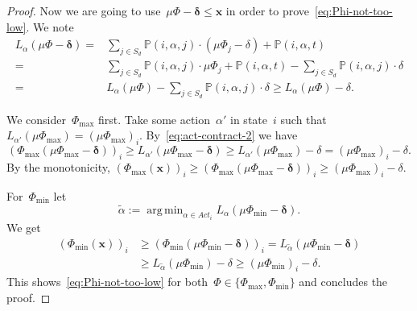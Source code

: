 \documentclass[preprint,12pt]{elsarticle}
\theoremstyle{plain}
\theoremstyle{definition}
\theoremstyle{remark}
\theoremstyle{claimstyle}
\newcommand{\prob}{\mathbb{P}}
\DeclareMathOperator*{\argmin}{arg\,min}
\begin{document}
\begin{proof}
Now we are going to use~$\mu\Phi - \bm{\delta} \leq \bm{x}$ in order to prove~\cref{eq:Phi-not-too-low}. We note
\begin{align}\label{eq:act-contract-2}
	L_{\alpha} (\mu\Phi - \bm{\delta})={} 
	&\sum_{j \in S_d} \prob(i,\alpha, j) \cdot (\mu\Phi_j - \delta) + \prob(i, \alpha, t)\nonumber \\
	={}&\sum_{j \in S_d} \prob(i,\alpha, j) \cdot \mu\Phi_j + \prob(i, \alpha, t) - \sum_{j \in S_d} \prob(i,\alpha, j) \cdot \delta \nonumber  \\
	={}&L_{\alpha}(\mu\Phi) - \sum_{j \in S_d} \prob(i,\alpha, j) \cdot \delta \geq 
	L_{\alpha}(\mu\Phi) - \delta.
\end{align}

We consider~$\Phi_{\max}$ first. Take
some action~$\alpha'$ in state~$i$ such that $L_{\alpha'}(\mu\Phi_{\max}) = (\mu\Phi_{\max})_i$. By~\eqref{eq:act-contract-2} we have
\[(\Phi_{\max}(\mu\Phi_{\max}-\bm{\delta}))_i \geq L_{\alpha'} (\mu\Phi_{\max} - \bm{\delta}) \geq
L_{\alpha'}(\mu\Phi_{\max}) - \delta = (\mu\Phi_{\max})_i - \delta.\]
By the monotonicity, $(\Phi_{\max}(\bm{x}))_i \geq (\Phi_{\max}(\mu\Phi_{\max}-\bm{\delta}))_i \geq (\mu\Phi_{\max})_i - \delta$.

For~$\Phi_{\min}$ let \[\tilde{\alpha} := \argmin_{\alpha \in Act_i} L_\alpha(\mu\Phi_{\min}  - \bm{\delta}).\] 
We get
\begin{align*}
	(\Phi_{\min}(\bm{x}))_i &\geq (\Phi_{\min}(\mu\Phi_{\min} - \bm{\delta}))_i = L_{\tilde{\alpha}}(\mu\Phi_{\min}  - \bm{\delta}) \\
&\geq L_{\tilde{\alpha}}(\mu\Phi_{\min}) - \delta \geq (\mu\Phi_{\min})_i - \delta.
\end{align*}
This shows~\cref{eq:Phi-not-too-low} for both~$\Phi \in \{\Phi_{\max},\Phi_{\min}\}$ and concludes the proof.
\end{proof}
\end{document}
